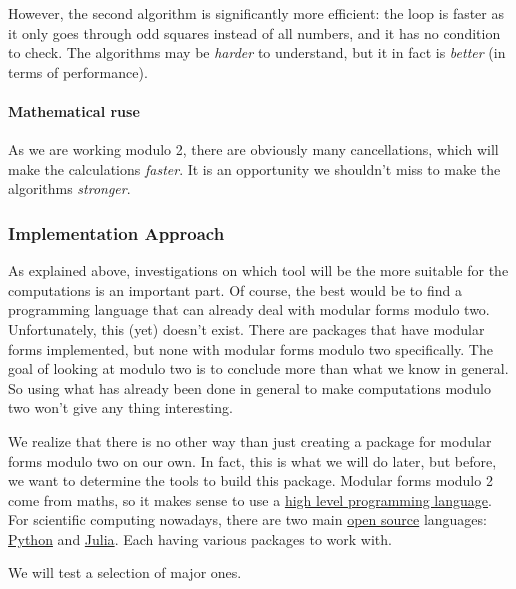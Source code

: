 However, the second algorithm is significantly more efficient: the loop is faster as it only goes through odd squares instead of all numbers, and it has no condition to check.
The algorithms may be \textit{harder} to understand, but it in fact is \textit{better} (in terms of performance).

\paragraph{Mathematical ruse}
As we are working modulo 2, there are obviously many cancellations, which will make the calculations \textit{faster}.
It is an opportunity we shouldn't miss to make the algorithms \textit{stronger}.
\subsubsection{Implementation Approach}
As explained above, investigations on which tool will be the more suitable for the computations is an important part.
Of course, the best would be to find a programming language that can already deal with modular forms modulo two.
Unfortunately, this (yet) doesn't exist.
There are packages that have modular forms implemented, but none with modular forms modulo two specifically.
The goal of looking at modulo two is to conclude more than what we know in general.
So using what has already been done in general to make computations modulo two won't give any thing interesting.

We realize that there is no other way than just creating a package for modular forms modulo two on our own.
In fact, this is what we will do later, but before, we want to determine the tools to build this package.
Modular forms modulo 2 come from maths, so it makes sense to use a \href{https://en.wikipedia.org/wiki/High-level_programming_language}{high level programming language}.
For scientific computing nowadays, there are two main \href{https://en.wikipedia.org/wiki/Open-source_model}{open source} languages: \href{https://en.wikipedia.org/wiki/Python_(programming_language)}{Python} and \href{https://en.wikipedia.org/wiki/Julia_(programming_language)}{Julia}.
Each having various packages to work with.

We will test a selection of major ones.

